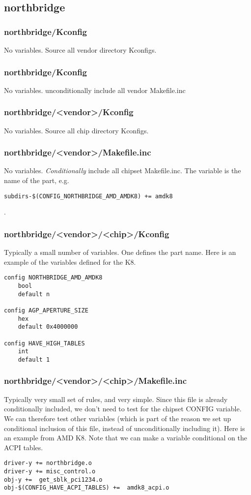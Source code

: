 \documentclass[10pt,letterpaper]{article}
\begin{document}
\subsection{northbridge}
\subsubsection{northbridge/Kconfig}
No variables. Source all vendor directory Kconfigs. 
\subsubsection{northbridge/Kconfig}
No variables. unconditionally include all vendor Makefile.inc
\subsubsection{northbridge/<vendor>/Kconfig}
No variables. Source all chip directory Kconfigs. 
\subsubsection{northbridge/<vendor>/Makefile.inc}
No variables. {\em Conditionally} include all chipset Makefile.inc. The variable 
is the name of the part, e.g. 
\begin{verbatim}
subdirs-$(CONFIG_NORTHBRIDGE_AMD_AMDK8) += amdk8
\end{verbatim}
.
\subsubsection{northbridge/<vendor>/<chip>/Kconfig}
Typically a small number of variables. One defines the part name. Here is an example 
of the variables defined for the K8. 
\begin{verbatim}
config NORTHBRIDGE_AMD_AMDK8
	bool
	default n

config AGP_APERTURE_SIZE
	hex
	default 0x4000000

config HAVE_HIGH_TABLES
	int
	default 1
\end{verbatim}
\subsubsection{northbridge/<vendor>/<chip>/Makefile.inc}
Typically very small set of rules, and very simple. 
Since this file is already conditionally included, 
we don't need to test for the chipset CONFIG variable. We
can therefore test other variables (which is part of the reason
we set up conditional inclusion of this file, instead
of unconditionally including it). Here is an example from AMD K8.
Note that we can make a variable conditional on the ACPI tables. 
\begin{verbatim}
driver-y += northbridge.o
driver-y += misc_control.o
obj-y +=  get_sblk_pci1234.o
obj-$(CONFIG_HAVE_ACPI_TABLES) +=  amdk8_acpi.o
\end{verbatim}
\end{document}
